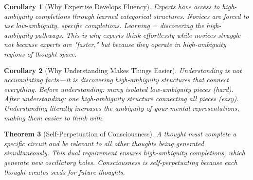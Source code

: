 \documentclass[11pt,a4paper]{article}
\newtheorem{theorem}{Theorem}
\newtheorem{corollary}[theorem]{Corollary}
\begin{document}
\begin{corollary}[Why Expertise Develops Fluency]
Experts have access to high-ambiguity completions through learned categorical structures. Novices are forced to use low-ambiguity, specific completions. Learning = discovering the high-ambiguity pathways. This is why experts think effortlessly while novices struggle—not because experts are "faster," but because they operate in high-ambiguity regions of thought space.
\end{corollary}

\begin{corollary}[Why Understanding Makes Things Easier]
Understanding is not accumulating facts—it is discovering high-ambiguity structures that connect everything. Before understanding: many isolated low-ambiguity pieces (hard). After understanding: one high-ambiguity structure connecting all pieces (easy). Understanding literally increases the ambiguity of your mental representations, making them easier to think with.
\end{corollary}

\begin{theorem}[Self-Perpetuation of Consciousness]
\label{thm:thought_propagation}
A thought must complete a specific circuit \textit{and} be relevant to all other thoughts being generated simultaneously. This dual requirement ensures high-ambiguity completions, which generate new oscillatory holes. Consciousness is self-perpetuating because each thought creates seeds for future thoughts.
\end{theorem}
\end{document}
